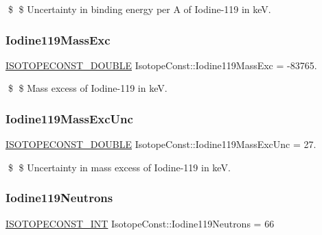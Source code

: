 \$ \$ Uncertainty in binding energy per A of Iodine-\/119 in keV. \mbox{\label{group___isotope_const-_iodine-_i119_ga42fd623b6cde9c45e5a7d0915ac39842}} 
\subsubsection{\texorpdfstring{Iodine119\+Mass\+Exc}{Iodine119MassExc}}
{\footnotesize\ttfamily \mbox{\hyperlink{group___isotope_const-_macros_ga8f45a7272ce02c0b4c65c44636ed719a}{I\+S\+O\+T\+O\+P\+E\+C\+O\+N\+S\+T\+\_\+\+D\+O\+U\+B\+LE}} Isotope\+Const\+::\+Iodine119\+Mass\+Exc = -\/83765.}

\$ \$ Mass excess of Iodine-\/119 in keV. \mbox{\label{group___isotope_const-_iodine-_i119_gae568a7db9525a3c1452bd6de2ccb8928}} 
\subsubsection{\texorpdfstring{Iodine119\+Mass\+Exc\+Unc}{Iodine119MassExcUnc}}
{\footnotesize\ttfamily \mbox{\hyperlink{group___isotope_const-_macros_ga8f45a7272ce02c0b4c65c44636ed719a}{I\+S\+O\+T\+O\+P\+E\+C\+O\+N\+S\+T\+\_\+\+D\+O\+U\+B\+LE}} Isotope\+Const\+::\+Iodine119\+Mass\+Exc\+Unc = 27.}

\$ \$ Uncertainty in mass excess of Iodine-\/119 in keV. \mbox{\label{group___isotope_const-_iodine-_i119_gaeda21298b19cfe92b18afbe0e29aa348}} 
\subsubsection{\texorpdfstring{Iodine119\+Neutrons}{Iodine119Neutrons}}
{\footnotesize\ttfamily \mbox{\hyperlink{group___isotope_const-_macros_ga5f18360b3e99483a35c32d789e62621c}{I\+S\+O\+T\+O\+P\+E\+C\+O\+N\+S\+T\+\_\+\+I\+NT}} Isotope\+Const\+::\+Iodine119\+Neutrons = 66}

